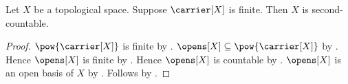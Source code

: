 \begin{theorem}\label{finite_topological_space_is_second_countable}
    Let $X$ be a topological space.
    Suppose $\carrier[X]$ is finite.
    Then $X$ is second-countable.
\end{theorem}
\begin{proof}
    $\pow{\carrier[X]}$ is finite by .
    $\opens[X]\subseteq\pow{\carrier[X]}$ by .
    Hence $\opens[X]$ is finite by .
    Hence $\opens[X]$ is countable by .
    $\opens[X]$ is an open basis of $X$ by .
    Follows by .
\end{proof}
